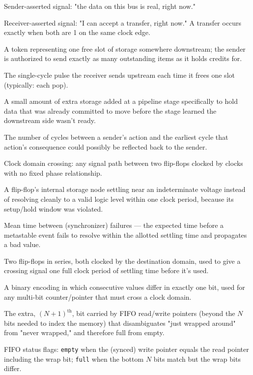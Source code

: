 \documentclass[12pt]{article}
\begin{document}
\begin{description}[leftmargin=3.2cm, style=nextline]
\item[valid] Sender-asserted signal: "the data on this bus is real, right
  now."
\item[ready] Receiver-asserted signal: "I can accept a transfer, right
  now." A transfer occurs exactly when both are 1 on the same clock edge.
\item[credit] A token representing one free slot of storage somewhere
  downstream; the sender is authorized to send exactly as many outstanding
  items as it holds credits for.
\item[credit return / credit\_ret] The single-cycle pulse the receiver
  sends upstream each time it frees one slot (typically: each pop).
\item[skid buffer] A small amount of extra storage added at a pipeline
  stage specifically to hold data that was already committed to move
  before the stage learned the downstream side wasn't ready.
\item[round-trip time (RTT)] The number of cycles between a sender's
  action and the earliest cycle that action's consequence could possibly
  be reflected back to the sender.
\item[CDC] Clock domain crossing: any signal path between two flip-flops
  clocked by clocks with no fixed phase relationship.
\item[metastability] A flip-flop's internal storage node settling near an
  indeterminate voltage instead of resolving cleanly to a valid logic
  level within one clock period, because its setup/hold window was
  violated.
\item[MTBF] Mean time between (synchronizer) failures — the expected time
  before a metastable event fails to resolve within the allotted
  settling time and propagates a bad value.
\item[2-flop synchronizer] Two flip-flops in series, both clocked by the
  destination domain, used to give a crossing signal one full clock
  period of settling time before it's used.
\item[Gray code] A binary encoding in which consecutive values differ in
  exactly one bit, used for any multi-bit counter/pointer that must cross
  a clock domain.
\item[wrap bit] The extra, $(N{+}1)^{\text{th}}$, bit carried by FIFO
  read/write pointers (beyond the $N$ bits needed to index the memory)
  that disambiguates "just wrapped around" from "never wrapped," and
  therefore full from empty.
\item[full / empty] FIFO status flags: \texttt{empty} when the (synced)
  write pointer equals the read pointer including the wrap bit;
  \texttt{full} when the bottom $N$ bits match but the wrap bits differ.
\end{description}
\end{document}
